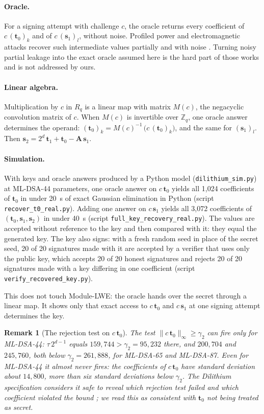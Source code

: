 \documentclass{article}
\newtheorem{remark}{Remark}
\newcommand{\sz}{\mathbf{s}_2}
\newcommand{\sone}{\mathbf{s}_1}
\newcommand{\tzero}{\mathbf{t}_0}
\newcommand{\tone}{\mathbf{t}_1}
\newcommand{\boldA}{\mathbf{A}}
\begin{document}
\paragraph{Oracle.}
For a signing attempt with challenge $c$, the oracle returns every coefficient
of $c\,(\tzero)_k$ and of $c\,(\sone)_l$, without noise.  Profiled power and
electromagnetic attacks recover such intermediate values partially and with
noise \cite{ravi2018side,berzati2023exploiting,marzougui2022profiling,qiao2023ntt}.
Turning noisy partial leakage into the exact oracle assumed here is the hard
part of those works and is not addressed by ours.

\paragraph{Linear algebra.}
Multiplication by $c$ in $R_q$ is a linear map with matrix $M(c)$, the
negacyclic convolution matrix of $c$.  When $M(c)$ is invertible over
$\mathbb{Z}_q$, one oracle answer determines the operand:
$(\tzero)_k = M(c)^{-1}\,\bigl(c\,(\tzero)_k\bigr)$, and the same for
$(\sone)_l$.  Then $\sz = 2^d\,\tone + \tzero - \boldA\,\sone$.

\paragraph{Simulation.}
With keys and oracle answers produced by a Python model
(\texttt{dilithium\_sim.py}) at ML-DSA-44 parameters, one oracle answer on $c\,\tzero$ yields all 1,024 coefficients of
$\tzero$ in under 20~s of exact Gaussian elimination in Python (script
\texttt{recover\_t0\_real.py}).  Adding one answer on $c\,\sone$ yields all
3,072 coefficients of $(\tzero, \sone, \sz)$ in under 40~s (script
\texttt{full\_key\_recovery\_real.py}).  The values are accepted without
reference to the key and then compared with it: they equal the generated key.
The key also signs: with a fresh random seed in place of the secret seed, 20 of
20 signatures made with it are accepted by a verifier that uses only the public
key, which accepts 20 of 20 honest signatures and rejects 20 of 20 signatures
made with a key differing in one coefficient (script
\texttt{verify\_recovered\_key.py}).

This does not touch Module-LWE: the oracle hands over the secret through a
linear map.  It shows only that exact access to $c\,\tzero$ and $c\,\sone$ at one
signing attempt determines the key.

\begin{remark}[The rejection test on $c\,\tzero$]
The test $\|c\,\tzero\|_\infty \ge \gamma_2$ can fire only for ML-DSA-44:
$\tau\,2^{d-1}$ equals $159{,}744 > \gamma_2 = 95{,}232$ there, and
$200{,}704$ and $245{,}760$, both below $\gamma_2 = 261{,}888$, for ML-DSA-65
and ML-DSA-87.  Even for ML-DSA-44 it almost never fires: the coefficients of
$c\,\tzero$ have standard deviation about $14{,}800$, more than six standard
deviations below $\gamma_2$.  The Dilithium specification considers it safe to
reveal which rejection test failed and which coefficient violated the bound
\cite[Section~5.5]{dilithium2021spec}; we read this as consistent with $\tzero$
not being treated as secret.
\end{remark}
\end{document}
